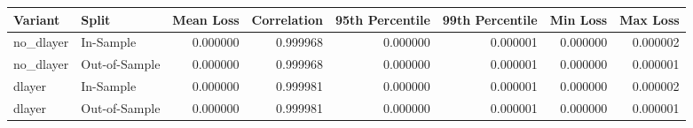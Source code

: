\begin{tabular}{llrrrrrr}
\toprule
Variant & Split & Mean Loss & Correlation & 95th Percentile & 99th Percentile & Min Loss & Max Loss \\
\midrule
no_dlayer & In-Sample & 0.000000 & 0.999968 & 0.000000 & 0.000001 & 0.000000 & 0.000002 \\
no_dlayer & Out-of-Sample & 0.000000 & 0.999968 & 0.000000 & 0.000001 & 0.000000 & 0.000001 \\
dlayer & In-Sample & 0.000000 & 0.999981 & 0.000000 & 0.000001 & 0.000000 & 0.000002 \\
dlayer & Out-of-Sample & 0.000000 & 0.999981 & 0.000000 & 0.000001 & 0.000000 & 0.000001 \\
\bottomrule
\end{tabular}
